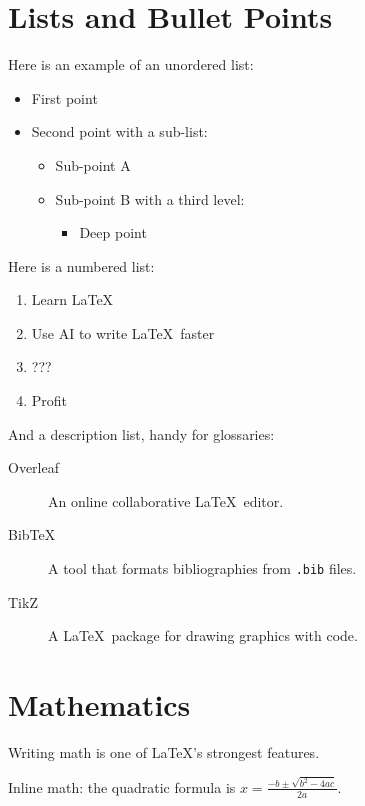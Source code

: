 \documentclass[12pt, a4paper]{article}
\theoremstyle{plain}
\theoremstyle{definition}
\begin{document}
\section{Lists and Bullet Points}
Here is an example of an unordered list:
\begin{itemize}
    \item First point
    \item Second point with a sub-list:
    \begin{itemize}
        \item Sub-point A
        \item Sub-point B with a third level:
        \begin{itemize}
            \item Deep point
        \end{itemize}
    \end{itemize}
\end{itemize}

Here is a numbered list:
\begin{enumerate}
    \item Learn \LaTeX
    \item Use AI to write \LaTeX\ faster
    \item ???
    \item Profit
\end{enumerate}

And a description list, handy for glossaries:
\begin{description}
    \item[Overleaf] An online collaborative \LaTeX\ editor.
    \item[BibTeX] A tool that formats bibliographies from \texttt{.bib} files.
    \item[TikZ] A \LaTeX\ package for drawing graphics with code.
\end{description}

\section{Mathematics}\label{sec:math}
Writing math is one of \LaTeX's strongest features.

Inline math: the quadratic formula is $x = \frac{-b \pm \sqrt{b^2 - 4ac}}{2a}$.
\end{document}
